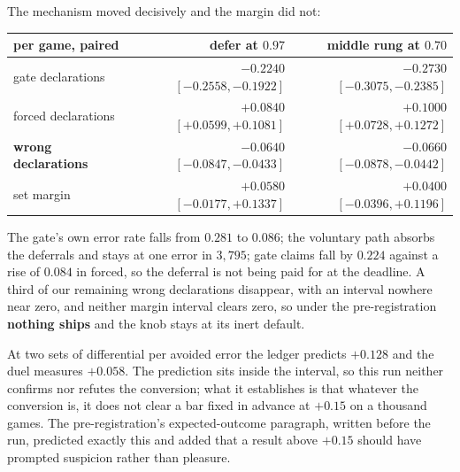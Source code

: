 \documentclass[11pt,letterpaper]{article}
\begin{document}
The mechanism moved decisively and the margin did not:

\begin{center}
\small
\begin{tabular}{lrr}
\toprule
per game, paired & defer at $0.97$ & middle rung at $0.70$ \\
\midrule
gate declarations & $-0.2240$ $[-0.2558, -0.1922]$ & $-0.2730$ $[-0.3075, -0.2385]$ \\
forced declarations & $+0.0840$ $[+0.0599, +0.1081]$ & $+0.1000$ $[+0.0728, +0.1272]$ \\
\textbf{wrong declarations} & $\mathbf{-0.0640}$ $[-0.0847, -0.0433]$ & $\mathbf{-0.0660}$ $[-0.0878, -0.0442]$ \\
\midrule
set margin & $+0.0580$ $[-0.0177, +0.1337]$ & $+0.0400$ $[-0.0396, +0.1196]$ \\
\bottomrule
\end{tabular}
\end{center}

\noindent The gate's own error rate falls from $0.281$ to $0.086$; the
voluntary path absorbs the deferrals and stays at one error in $3{,}795$; gate
claims fall by $0.224$ against a rise of $0.084$ in forced, so the deferral is
not being paid for at the deadline. A third of our remaining wrong
declarations disappear, with an interval nowhere near zero, and neither
margin interval clears zero, so under the pre-registration \textbf{nothing
ships} and the knob stays at its inert default.

At two sets of differential per avoided error the ledger predicts $+0.128$ and
the duel measures $+0.058$. The prediction sits inside the interval, so this
run neither confirms nor refutes the conversion; what it establishes is that
whatever the conversion is, it does not clear a bar fixed in advance at
$+0.15$ on a thousand games. The pre-registration's expected-outcome
paragraph, written before the run, predicted exactly this and added that a
result above $+0.15$ should have prompted suspicion rather than pleasure.
\end{document}
